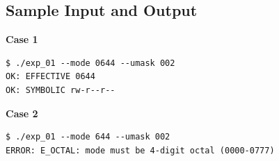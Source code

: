 \subsection{Sample Input and Output}

\textbf{Case 1}
\begin{verbatim}
$ ./exp_01 --mode 0644 --umask 002 
OK: EFFECTIVE 0644
OK: SYMBOLIC rw-r--r--
\end{verbatim}

\textbf{Case 2}
\begin{verbatim}
$ ./exp_01 --mode 644 --umask 002 
ERROR: E_OCTAL: mode must be 4-digit octal (0000-0777)
\end{verbatim}